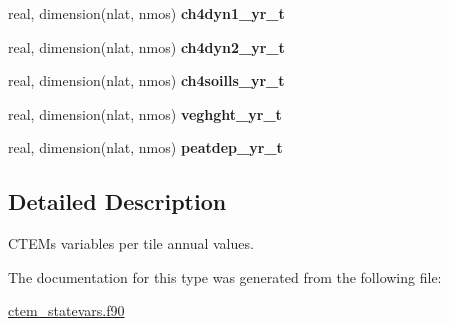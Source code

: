 \begin{DoxyCompactItemize}
\item 
\hypertarget{structctem__statevars_1_1ctem__tileavg__annual_a16a3d0604144a08410f1e1d16449e548}{}real, dimension(nlat, nmos) {\bfseries ch4dyn1\+\_\+yr\+\_\+t}\label{structctem__statevars_1_1ctem__tileavg__annual_a16a3d0604144a08410f1e1d16449e548}

\item 
\hypertarget{structctem__statevars_1_1ctem__tileavg__annual_ae1705c34b1db3514449a1b3b0f6ad0b2}{}real, dimension(nlat, nmos) {\bfseries ch4dyn2\+\_\+yr\+\_\+t}\label{structctem__statevars_1_1ctem__tileavg__annual_ae1705c34b1db3514449a1b3b0f6ad0b2}

\item 
\hypertarget{structctem__statevars_1_1ctem__tileavg__annual_ab67d092e8b427e22886fa04fc552cfde}{}real, dimension(nlat, nmos) {\bfseries ch4soills\+\_\+yr\+\_\+t}\label{structctem__statevars_1_1ctem__tileavg__annual_ab67d092e8b427e22886fa04fc552cfde}

\item 
\hypertarget{structctem__statevars_1_1ctem__tileavg__annual_ae2944baabbe643406d14e8b72ea34708}{}real, dimension(nlat, nmos) {\bfseries veghght\+\_\+yr\+\_\+t}\label{structctem__statevars_1_1ctem__tileavg__annual_ae2944baabbe643406d14e8b72ea34708}

\item 
\hypertarget{structctem__statevars_1_1ctem__tileavg__annual_ac38c6c1d52df66f312389d971e1a4d2c}{}real, dimension(nlat, nmos) {\bfseries peatdep\+\_\+yr\+\_\+t}\label{structctem__statevars_1_1ctem__tileavg__annual_ac38c6c1d52df66f312389d971e1a4d2c}

\end{DoxyCompactItemize}


\subsection{Detailed Description}
C\+T\+E\+M\textquotesingle{}s variables per tile annual values. 

The documentation for this type was generated from the following file\+:\begin{DoxyCompactItemize}
\item 
\hyperlink{ctem__statevars_8f90}{ctem\+\_\+statevars.\+f90}\end{DoxyCompactItemize}
